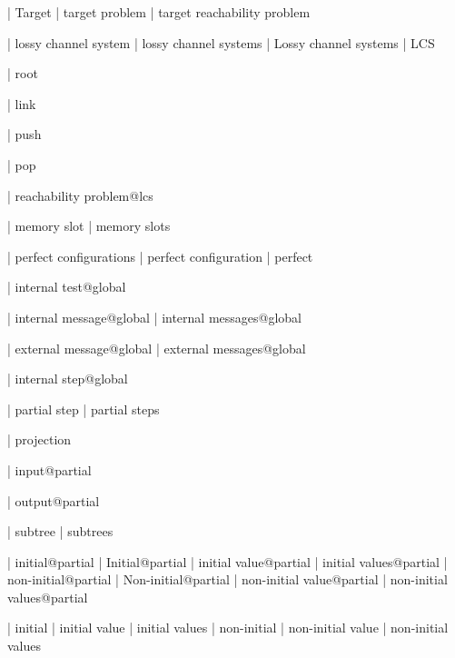 | Target
| target problem
| target reachability problem


| lossy channel system
| lossy channel systems
| Lossy channel systems
| LCS

| root

| link

| push

| pop

| reachability problem@lcs


| memory slot
| memory slots

| perfect configurations
| perfect configuration
| perfect


| internal test@global

| internal message@global
| internal messages@global

| external message@global
| external messages@global

| internal step@global

| partial step
| partial steps

| projection

| input@partial

| output@partial

| subtree
| subtrees

| initial@partial
| Initial@partial
| initial value@partial
| initial values@partial
| non-initial@partial
| Non-initial@partial
| non-initial value@partial
| non-initial values@partial

| initial
| initial value
| initial values
| non-initial
| non-initial value
| non-initial values